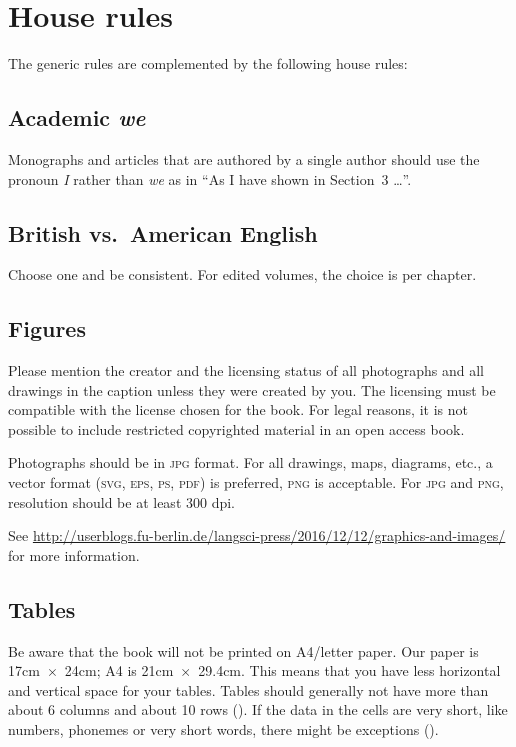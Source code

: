 \section{House rules}\label{sec:houserules}
The generic rules are complemented by the following house rules:

\subsection{Academic \emph{we}}

Monographs and articles that are authored by a single author should use the pronoun \emph{I} rather
than \emph{we} as in ``As I have shown in Section~3 {\dots}''.	
 

\subsection{British vs.\ American English}
Choose one and be consistent. For edited volumes, the choice is per chapter.  


\subsection{Figures}  
Please mention the creator and the licensing status of all photographs and all drawings in the caption unless they were created by you. The licensing must be compatible with the license chosen for the book. For legal reasons, it is not possible to include restricted copyrighted material in an open access book. 

Photographs should be in \textsc{jpg} format. For all drawings, maps, diagrams, etc., a vector format (\textsc{svg}, \textsc{eps}, \textsc{ps}, \textsc{pdf}) is preferred, \textsc{png} is acceptable. For \textsc{jpg} and \textsc{png}, resolution should be at least 300 dpi. 

See \url{http://userblogs.fu-berlin.de/langsci-press/2016/12/12/graphics-and-images/} for more information.

\subsection{Tables}
Be aware that the book will not be printed on A4\slash letter paper. Our paper is 17cm~$\times$~24cm; A4 is 21cm~$\times$~29.4cm.  This means that you have less horizontal and vertical space for your tables. Tables should generally not have more than about 6 columns and about 10 rows (). If the data in the cells are very short, like numbers, phonemes or very short words, there might be exceptions ().


